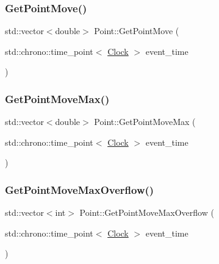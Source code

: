 \mbox{\label{classPoint_a46d06a6d5e8107a0321ede4ca162f264}} 
\subsubsection{\texorpdfstring{Get\+Point\+Move()}{GetPointMove()}}
{\footnotesize\ttfamily std\+::vector$<$double$>$ Point\+::\+Get\+Point\+Move (\begin{DoxyParamCaption}\item[{std\+::chrono\+::time\+\_\+point$<$ \mbox{\hyperlink{universe_8h_a0ef8d951d1ca5ab3cfaf7ab4c7a6fd80}{Clock}} $>$}]{event\+\_\+time }\end{DoxyParamCaption})\hspace{0.3cm}{\ttfamily [inline]}}

\mbox{\label{classPoint_af67ce3da60a8e3907df6ec193786c2ae}} 
\subsubsection{\texorpdfstring{Get\+Point\+Move\+Max()}{GetPointMoveMax()}}
{\footnotesize\ttfamily std\+::vector$<$double$>$ Point\+::\+Get\+Point\+Move\+Max (\begin{DoxyParamCaption}\item[{std\+::chrono\+::time\+\_\+point$<$ \mbox{\hyperlink{universe_8h_a0ef8d951d1ca5ab3cfaf7ab4c7a6fd80}{Clock}} $>$}]{event\+\_\+time }\end{DoxyParamCaption})\hspace{0.3cm}{\ttfamily [inline]}}

\mbox{\label{classPoint_a83e3715d429ab2099f0c421d46603004}} 
\subsubsection{\texorpdfstring{Get\+Point\+Move\+Max\+Overflow()}{GetPointMoveMaxOverflow()}}
{\footnotesize\ttfamily std\+::vector$<$int$>$ Point\+::\+Get\+Point\+Move\+Max\+Overflow (\begin{DoxyParamCaption}\item[{std\+::chrono\+::time\+\_\+point$<$ \mbox{\hyperlink{universe_8h_a0ef8d951d1ca5ab3cfaf7ab4c7a6fd80}{Clock}} $>$}]{event\+\_\+time }\end{DoxyParamCaption})\hspace{0.3cm}{\ttfamily [inline]}}

